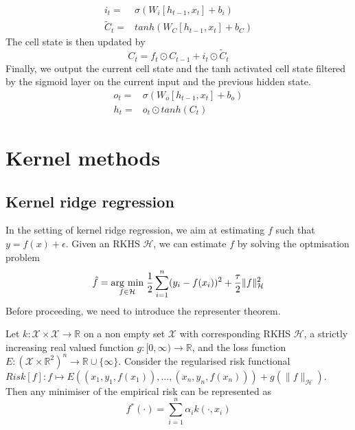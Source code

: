 \begin{equation}
    \begin{aligned}
        i_t=&\sigma(W_i [h_{t-1},x_t]+b_i)
        \\
        \tilde{C}_t=&tanh(W_C [h_{t-1},x_t]+b_C)
    \end{aligned}
\end{equation}
The cell state is then updated by
\begin{equation}
    C_t=f_t\odot C_{t-1}+i_t\odot \tilde{C}_t
\end{equation}
Finally, we output the current cell state and the tanh activated cell state filtered by the sigmoid layer on the current input and the previous hidden state.
\begin{equation}
    \begin{aligned}
    o_t=& \sigma(W_o[h_{t-1},x_t]+b_o)
    \\
    h_t=& o_t \odot tanh(C_t)
\end{aligned}
\end{equation}


\section{Kernel methods}
\subsection{Kernel ridge regression}
In the setting of kernel ridge regression, we aim at estimating $f$ such that $y=f(x)+\epsilon$. Given an RKHS $\mathcal{H}$, we can estimate $f$ by solving the optmisation problem
\begin{equation}\label{eq:kernel ridge}
    \hat{f}=\underset{f\in \mathcal{H}}{\operatorname{arg}\,\operatorname{min}}\;\frac{1}{2}\sum\limits_{i=1}^n(y_i-f(x_i))^2+\frac{\tau}{2}\|f\|_{\mathcal{H}}^2
\end{equation}
Before proceeding, we need to introduce the representer theorem.
\begin{theorem}
    Let $k:\mathcal{X} \times \mathcal{X} \to \mathbb{R}$ on a non empty set $\mathcal{X}$ with corresponding RKHS $\mathcal{H}$,
    a strictly increasing real valued function $g:[0,\infty) \to \mathbb{R}$, and the loss function $E:(\mathcal{X}\times \mathbb{R}^2)^n \to \mathbb{R} \cup \{\infty\}$.
    Consider the regularised risk functional $Risk[f]:f \mapsto  E\left((x_{1},y_{1},f(x_{1})),\ldots, (x_{n},y_{n},f(x_{n}))\right)+g\left(\| f\|_{\mathcal{H}} \right)$. Then any minimiser of the empirical risk can be represented as $$ f^{*}(\cdot )=\sum\limits_{i=1}^{n}\alpha _{i}k(\cdot ,x_{i})$$
\end{theorem}

